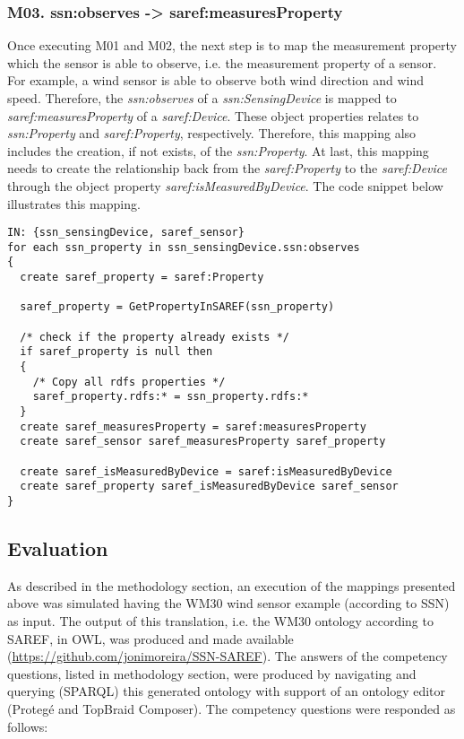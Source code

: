 \documentclass{sig-alternate-05-2015}
\begin{document}
\subsubsection{M03. ssn:observes -> saref:measuresProperty}
Once executing M01 and M02, the next step is to map the measurement property which the sensor is able to observe, i.e. the measurement property of a sensor. For example, a wind sensor is able to observe both wind direction and wind speed. Therefore, the \textit{ssn:observes} of a \textit{ssn:SensingDevice} is mapped to \textit{saref:measuresProperty} of a \textit{saref:Device}. These object properties relates to \textit{ssn:Property} and \textit{saref:Property}, respectively. Therefore, this mapping also includes the creation, if not exists, of the \textit{ssn:Property}. At last, this mapping needs to create the relationship back from the \textit{saref:Property} to the \textit{saref:Device} through the object property \textit{saref:isMeasuredByDevice}. The code snippet below illustrates this mapping. 

\begin{lstlisting}[caption={Pseudocode snippet for M02},label={code:sample}]
IN: {ssn_sensingDevice, saref_sensor}
for each ssn_property in ssn_sensingDevice.ssn:observes 
{ 
  create saref_property = saref:Property 
  
  saref_property = GetPropertyInSAREF(ssn_property)
    
  /* check if the property already exists */
  if saref_property is null then 
  { 
    /* Copy all rdfs properties */ 
    saref_property.rdfs:* = ssn_property.rdfs:* 
  } 
  create saref_measuresProperty = saref:measuresProperty 
  create saref_sensor saref_measuresProperty saref_property 
  
  create saref_isMeasuredByDevice = saref:isMeasuredByDevice
  create saref_property saref_isMeasuredByDevice saref_sensor
}
\end{lstlisting}

\subsection{Evaluation}
As described in the methodology section, an execution of the mappings presented above was simulated having the WM30 wind sensor example (according to SSN) as input. The output of this translation, i.e. the WM30 ontology according to SAREF, in OWL, was produced and made available (\url{https://github.com/jonimoreira/SSN-SAREF}). The answers of the competency questions, listed in methodology section, were produced by navigating and querying (SPARQL) this generated ontology with support of an ontology editor (Protegé and TopBraid Composer). The competency questions were responded as follows:
\end{document}
